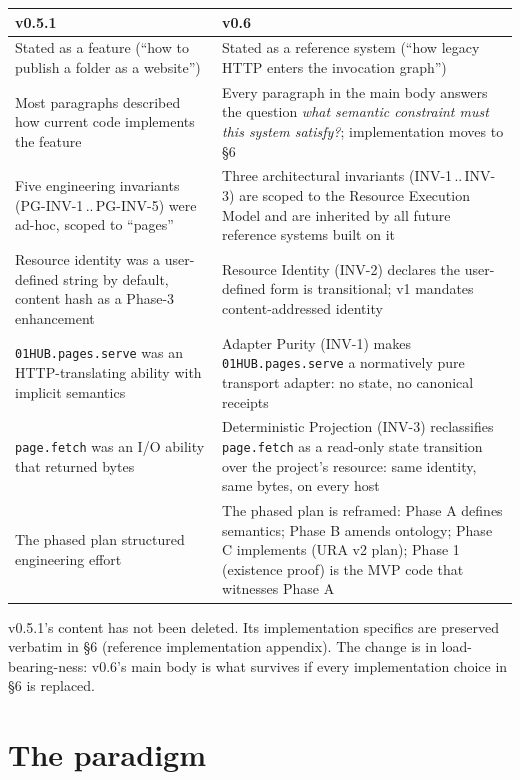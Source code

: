 \documentclass[11pt,a4paper]{article}
\theoremstyle{definition}
\begin{document}
\begin{center}
\renewcommand{\arraystretch}{1.25}
\begin{tabularx}{\linewidth}{l X}
\toprule
\textbf{v0.5.1} & \textbf{v0.6} \\
\midrule
Stated as a feature (``how to publish a folder as a website'') & Stated as a reference system (``how legacy HTTP enters the invocation graph'') \\
Most paragraphs described how current code implements the feature & Every paragraph in the main body answers the question \emph{what semantic constraint must this system satisfy?}; implementation moves to §6 \\
Five engineering invariants (PG-INV-1\,..\,PG-INV-5) were ad-hoc, scoped to ``pages'' & Three architectural invariants (INV-1\,..\,INV-3) are scoped to the Resource Execution Model and are inherited by all future reference systems built on it \\
Resource identity was a user-defined string by default, content hash as a Phase-3 enhancement & Resource Identity (INV-2) declares the user-defined form is transitional; v1 mandates content-addressed identity \\
\texttt{01HUB.pages.serve} was an HTTP-translating ability with implicit semantics & Adapter Purity (INV-1) makes \texttt{01HUB.pages.serve} a normatively pure transport adapter: no state, no canonical receipts \\
\texttt{page.fetch} was an I/O ability that returned bytes & Deterministic Projection (INV-3) reclassifies \texttt{page.fetch} as a read-only state transition over the project's resource: same identity, same bytes, on every host \\
The phased plan structured engineering effort & The phased plan is reframed: Phase A defines semantics; Phase B amends ontology; Phase C implements (URA v2 plan); Phase 1 (existence proof) is the MVP code that witnesses Phase A \\
\bottomrule
\end{tabularx}
\end{center}

\noindent v0.5.1's content has not been deleted. Its
implementation specifics are preserved verbatim in §6 (reference
implementation appendix). The change is in load-bearing-ness:
v0.6's main body is what survives if every implementation choice
in §6 is replaced.

\section{The paradigm}
\label{sec:paradigm}
\end{document}
